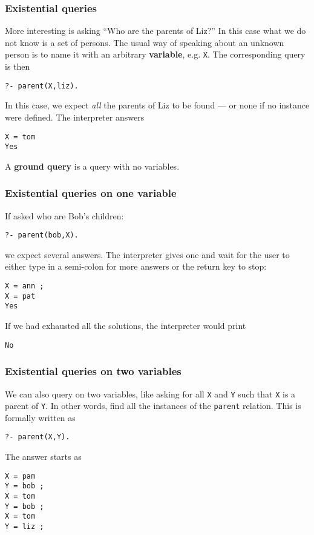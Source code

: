 %
\begin{frame}[containsverbatim]
\frametitle{Existential queries}

More interesting is asking ``Who are the parents of Liz?'' In this
case what we do not know is a set of persons. The usual way of
speaking about an unknown person is to name it with an arbitrary
\textbf{variable}, e.g. \texttt{X}. The corresponding \Prolog query is
then
{\small
\begin{verbatim}
?- parent(X,liz).
\end{verbatim}
}
In this case, we expect \emph{all} the parents of Liz to be found --- or
none if no instance were defined. The interpreter answers
{\small
\begin{verbatim}
X = tom
Yes
\end{verbatim}
}
A \textbf{ground query} is a query with no variables.

\end{frame}

%
\begin{frame}[containsverbatim]
\frametitle{Existential queries on one variable}

If asked who are Bob's children:
{\small
\begin{verbatim}
?- parent(bob,X).
\end{verbatim}
}
we expect several answers. The interpreter gives one and wait for the
user to either type in a semi-colon for more answers or the return
key to stop:
{\small
\begin{verbatim}
X = ann ;
X = pat 
Yes
\end{verbatim}
}
If we had exhausted all the solutions, the interpreter would print
{\small
\begin{verbatim}
No
\end{verbatim}
}

\end{frame}

%
\begin{frame}[containsverbatim]
\frametitle{Existential queries on two variables}

We can also query on two variables, like asking for all \texttt{X} and
\texttt{Y} such that \texttt{X} is a parent of \texttt{Y}. In other
words, find all the instances of the \texttt{parent} relation. This is
formally written as
{\small
\begin{verbatim}
?- parent(X,Y).
\end{verbatim}
}
The answer starts as
{\small
\begin{verbatim}
X = pam
Y = bob ;
X = tom
Y = bob ;
X = tom
Y = liz ;
\end{verbatim}
}

\end{frame}

